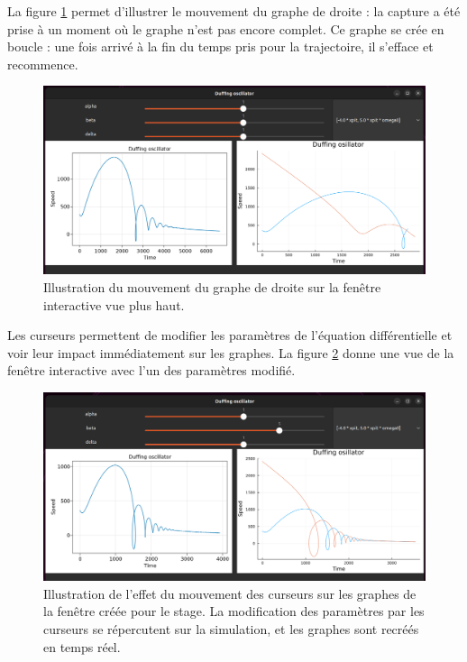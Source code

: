 \documentclass[a4paper, french, 12pt, titlepage]{article}
\begin{document}
La figure \ref{fig:fig3} permet d'illustrer le mouvement du graphe de droite : la capture a été prise à un moment où le graphe n'est pas encore complet.
Ce graphe se crée en boucle : une fois arrivé à la fin du temps pris pour la trajectoire, il s'efface et recommence. 

\begin{figure}[htb]
  \includegraphics[width=\linewidth]{interactivewindow_2.png}
  \caption{Illustration du mouvement du graphe de droite sur la fenêtre interactive vue plus haut.}
  \label{fig:fig3}
\end{figure}


Les curseurs permettent de modifier les paramètres de l'équation différentielle et voir leur impact immédiatement sur les graphes.
La figure \ref{fig:fig4} donne une vue de la fenêtre interactive avec l'un des paramètres modifié. 


\begin{figure}[H]
  \includegraphics[width=\linewidth]{interactivewindow_3.png}
  \caption{Illustration de l'effet du mouvement des curseurs sur les graphes de la fenêtre créée pour le stage. La modification des paramètres par les curseurs se répercutent sur la simulation, et les graphes sont recréés en temps réel.}
  \label{fig:fig4}
\end{figure}
\end{document}
